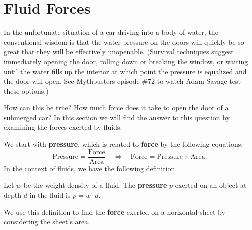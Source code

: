 \section{Fluid Forces}\label{sec:fluid_force}

In the unfortunate situation of a car driving into a body of water, the conventional wisdom is that the water pressure on the doors will quickly be so great that they will be effectively unopenable. (Survival techniques suggest immediately opening the door, rolling down or breaking the window, or waiting until the water fills up the interior at which point the pressure is equalized and the door will open. See Mythbusters episode \#72 to watch Adam Savage test these options.)

How can this be true? How much force does it take to open the door of a submerged car? In this section we will find the answer to this question by examining the forces exerted by fluids.

We start with \textbf{pressure}, which is related to \textbf{force} by the following equations:
\[
\text{Pressure} = \frac{\text{Force}}{\text{Area}}
\quad  \Leftrightarrow \quad
\text{Force} = \text{Pressure}\times\text{Area}.
\]
In the context of fluids, we have the following definition.

\begin{definition}\label{def:fluid_pressure}
Let $w$ be the weight-density of a fluid. The \textbf{pressure} $p$ exerted on an object at depth $d$ in the fluid is $p = w\cdot d.$
\end{definition}

We use this definition to find the \textbf{force} exerted on a horizontal sheet by considering the sheet's area.


